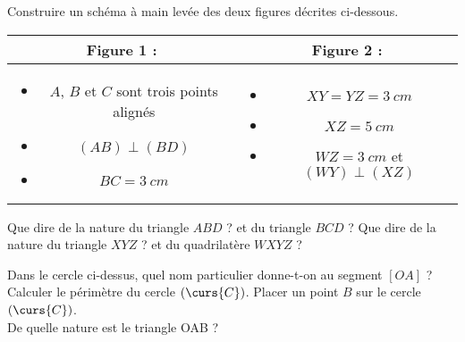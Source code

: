 \documentclass[11pt]{memoir}
\begin{document}
\begin{questions}

\exercice 

\question Construire un schéma à main levée des deux figures décrites ci-dessous.
\vspace{1em}

\begin{tabular}{cc}\hline
Figure 1 : & Figure 2 : \\\hline
\begin{minipage}{0.4\linewidth}
\begin{itemize}
    \item $A$, $B$ et $C$ sont trois points alignés
    \item $(AB) \perp (BD)$
    \item $BC = \qty{3}{cm}$
\end{itemize}
\end{minipage}
&
\begin{minipage}{0.4\linewidth}
\begin{itemize}
    \item $XY = YZ = \qty{3}{cm}$
    \item $XZ = \qty{5}{cm}$
    \item $WZ = \qty{3}{cm}$ et $(WY) \perp (XZ)$
\end{itemize}
\end{minipage}\\\hline
\end{tabular}

\vspace{1em}

\question Que dire de la nature du triangle $ABD$ ? et du triangle $BCD$ ?
\question Que dire de la nature du triangle $XYZ$ ? et du quadrilatère $WXYZ$ ?

\exercice 

\begin{wrapfigure}{R}{0.15\textwidth}
    \vspace{-1cm}
\end{wrapfigure}

\question Dans le cercle ci-dessus, quel nom particulier donne-t-on au segment $[OA]$ ?
\question Calculer le périmètre du cercle $(\curs{C})$.
\question Placer un point $B$ sur le cercle $(\curs{C})$. \\De quelle nature est le triangle OAB ?


\end{questions}
\end{document}
